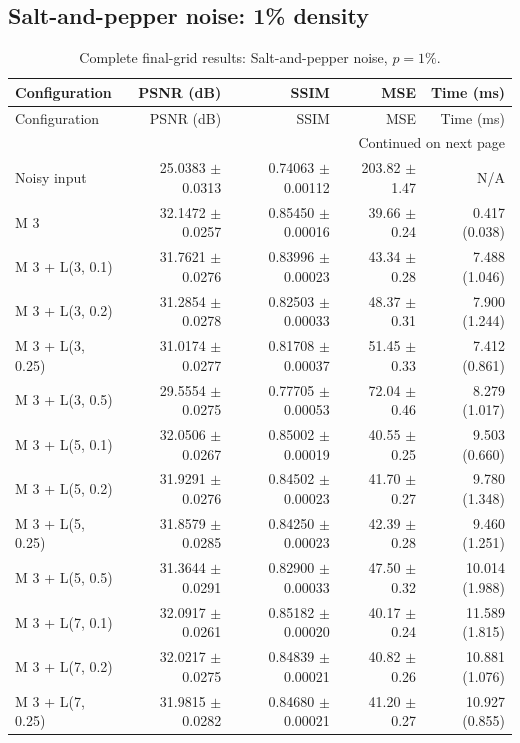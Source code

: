 \subsection{Salt-and-pepper noise: 1\% density}
\begingroup
\footnotesize
\setlength{\tabcolsep}{4pt}
\begin{longtable}{lrrrr}
\caption{Complete final-grid results: Salt-and-pepper noise, $p=1\%$.}\\
\toprule Configuration & PSNR (dB) & SSIM & MSE & Time (ms) \\ \midrule
\endfirsthead
\toprule Configuration & PSNR (dB) & SSIM & MSE & Time (ms) \\ \midrule
\endhead
\midrule \multicolumn{5}{r}{Continued on next page}\\
\endfoot
\bottomrule
\endlastfoot
Noisy input & 25.0383 $\pm$ 0.0313 & 0.74063 $\pm$ 0.00112 & 203.82 $\pm$ 1.47 & N/A \\
M 3 & 32.1472 $\pm$ 0.0257 & 0.85450 $\pm$ 0.00016 & 39.66 $\pm$ 0.24 & 0.417 (0.038) \\
M 3 + L(3, 0.1) & 31.7621 $\pm$ 0.0276 & 0.83996 $\pm$ 0.00023 & 43.34 $\pm$ 0.28 & 7.488 (1.046) \\
M 3 + L(3, 0.2) & 31.2854 $\pm$ 0.0278 & 0.82503 $\pm$ 0.00033 & 48.37 $\pm$ 0.31 & 7.900 (1.244) \\
M 3 + L(3, 0.25) & 31.0174 $\pm$ 0.0277 & 0.81708 $\pm$ 0.00037 & 51.45 $\pm$ 0.33 & 7.412 (0.861) \\
M 3 + L(3, 0.5) & 29.5554 $\pm$ 0.0275 & 0.77705 $\pm$ 0.00053 & 72.04 $\pm$ 0.46 & 8.279 (1.017) \\
M 3 + L(5, 0.1) & 32.0506 $\pm$ 0.0267 & 0.85002 $\pm$ 0.00019 & 40.55 $\pm$ 0.25 & 9.503 (0.660) \\
M 3 + L(5, 0.2) & 31.9291 $\pm$ 0.0276 & 0.84502 $\pm$ 0.00023 & 41.70 $\pm$ 0.27 & 9.780 (1.348) \\
M 3 + L(5, 0.25) & 31.8579 $\pm$ 0.0285 & 0.84250 $\pm$ 0.00023 & 42.39 $\pm$ 0.28 & 9.460 (1.251) \\
M 3 + L(5, 0.5) & 31.3644 $\pm$ 0.0291 & 0.82900 $\pm$ 0.00033 & 47.50 $\pm$ 0.32 & 10.014 (1.988) \\
M 3 + L(7, 0.1) & 32.0917 $\pm$ 0.0261 & 0.85182 $\pm$ 0.00020 & 40.17 $\pm$ 0.24 & 11.589 (1.815) \\
M 3 + L(7, 0.2) & 32.0217 $\pm$ 0.0275 & 0.84839 $\pm$ 0.00021 & 40.82 $\pm$ 0.26 & 10.881 (1.076) \\
M 3 + L(7, 0.25) & 31.9815 $\pm$ 0.0282 & 0.84680 $\pm$ 0.00021 & 41.20 $\pm$ 0.27 & 10.927 (0.855) \\

\end{longtable}
